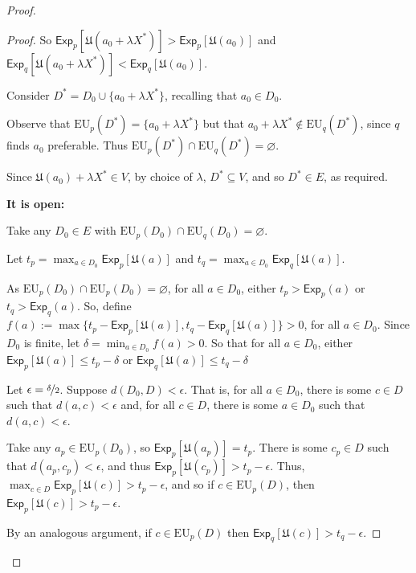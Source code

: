 \documentclass[a4paper]{article}
\newcommand\Exp{\mathsf{Exp}}
\newcommand\EU{\mathrm{EU}}
\newcommand\U{\mathfrak{U}} %
\renewcommand{\emptyset}{\varnothing}
\renewcommand{\leq}{\leqslant}
\newenvironment{CCM rewritten}
{\begingroup\color{blue}} %
{\endgroup}              %
\begin{document}
\begin{proof}
\begin{proof}
		So $\Exp_{p}[\U(a_0+\lambda X^*)]>\Exp_{p}[\U(a_0)]$ and $\Exp_{q}[\U(a_0+\lambda X^*)]<\Exp_{q}[\U(a_0)]$.
		
		Consider $D^*=D_0\cup\{a_0+\lambda X^*\}$, recalling that $a_0\in D_0$. 
		
		Observe that $\EU_{p}(D^*)=\{a_0+\lambda X^*\}$ but that $a_0+\lambda X^*\notin\EU_{q}(D^*)$, since $q$ finds $a_0$ preferable. 
		Thus $\EU_{p}(D^*)\cap \EU_{q}(D^*)=\emptyset$.
		
		Since $\U(a_0)+\lambda X^*\in V$, by choice of $\lambda$, $D^*\subseteq V$, and so $D^*\in E$, as required. 
		
		\textbf{It is open:}
		
		Take any $D_0\in E$ with $\EU_{p}(D_0)\cap \EU_{q}(D_0)=\emptyset$. 
		
		Let $t_p=\max_{a\in D_0}\Exp_{p}[\U(a)]$ and $t_q=\max_{a\in D_0}\Exp_{q}[\U(a)]$.
		
		As  $\EU_{p}(D_0)\cap \EU_{p}(D_0)=\emptyset$, for all $a\in D_0$, either $t_p>\Exp_{p}(a)$ or  $t_q>\Exp_{q}(a)$. So, define $f(a):=\max\{t_p-\Exp_{p}[\U(a)],t_q-\Exp_{q}[\U(a)]\}>0$, for all $a\in D_0$. Since $D_0$ is finite, let $\delta=\min_{a\in D_0}f(a)>0$. So that for all $a\in D_0$, either  $\Exp_{p}[\U(a)]\leq t_p-\delta$ or $\Exp_{q}[\U(a)]\leq t_q-\delta$
		
		Let $\epsilon=\nicefrac{\delta}{2}$. Suppose $d(D_0,D)<\epsilon$. That is, for all $a\in D_0$, there is some $c\in D$ such that $d(a,c)<\epsilon$ and, for all $c\in D$, there is some $a\in D_0$ such that $d(a,c)<\epsilon$. 
		
		Take any $a_p\in \EU_{p}(D_0)$, so $\Exp_{p}[\U(a_p)]=t_p$. There is some $c_p\in D$ such that $d(a_p,c_p)<\epsilon$, and thus $\Exp_{p}[\U(c_p)]>t_p-\epsilon$. Thus, $\max_{c\in D}\Exp_{p}[\U(c)]>t_p-\epsilon$, and so if $c\in \EU_{p}(D)$, then $\Exp_{p}[\U(c)]>t_p-\epsilon$. 
		
		
		By an analogous argument, if $c\in \EU_{p}(D)$ then $\Exp_{q}[\U(c)]>t_q-\epsilon$. 
		

\end{proof}
\end{proof}
\end{document}
